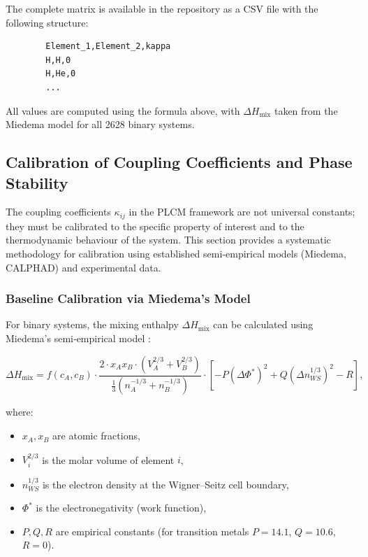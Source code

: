 \documentclass[12pt,a4paper]{article}
\begin{document}
	The complete matrix is available in the repository as a CSV file with the following structure:
	\begin{verbatim}
		Element_1,Element_2,kappa
		H,H,0
		H,He,0
		...
	\end{verbatim}
	
	All values are computed using the formula above, with \(\Delta H_{\text{mix}}\) taken from the Miedema model \cite{Takeuchi2010} for all 2628 binary systems.
	
	\subsection{Calibration of Coupling Coefficients and Phase Stability}
	\label{subsec:calibration}
	
	The coupling coefficients \(\kappa_{ij}\) in the PLCM framework are not universal constants; they must be calibrated to the specific property of interest and to the thermodynamic behaviour of the system. This section provides a systematic methodology for calibration using established semi‑empirical models (Miedema, CALPHAD) and experimental data.
	
	\subsubsection{Baseline Calibration via Miedema's Model}
	
	For binary systems, the mixing enthalpy \(\Delta H_{\text{mix}}\) can be calculated using Miedema's semi‑empirical model \cite{Miedema1980, Takeuchi2010}:
	
	\begin{equation}
		\Delta H_{\text{mix}} = f(c_A, c_B) \cdot \frac{2 \cdot x_A x_B \cdot (V_A^{2/3} + V_B^{2/3})}{\frac{1}{3}(n_A^{-1/3} + n_B^{-1/3})}
		\cdot \left[ -P (\Delta \Phi^*)^2 + Q (\Delta n_{WS}^{1/3})^2 - R \right],
		\label{eq:miedema}
	\end{equation}
	
	where:
	\begin{itemize}
		\item \(x_A, x_B\) are atomic fractions,
		\item \(V_i^{2/3}\) is the molar volume of element \(i\),
		\item \(n_{WS}^{1/3}\) is the electron density at the Wigner–Seitz cell boundary,
		\item \(\Phi^*\) is the electronegativity (work function),
		\item \(P, Q, R\) are empirical constants (for transition metals \(P=14.1\), \(Q=10.6\), \(R=0\)).
	\end{itemize}
	
\end{document}
